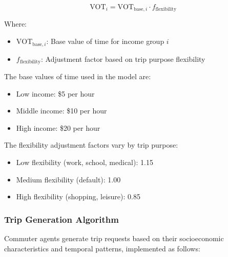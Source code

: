 \begin{equation}
\text{VOT}_i = \text{VOT}_{\text{base},i} \cdot f_{\text{flexibility}}
\end{equation}

Where:
\begin{itemize}
    \item $\text{VOT}_{\text{base},i}$: Base value of time for income group $i$
    \item $f_{\text{flexibility}}$: Adjustment factor based on trip purpose flexibility
\end{itemize}

The base values of time used in the model are:
\begin{itemize}
    \item Low income: \$5 per hour 
    \item Middle income: \$10 per hour 
    \item High income: \$20 per hour 
\end{itemize}

The flexibility adjustment factors vary by trip purpose:
\begin{itemize}
    \item Low flexibility (work, school, medical): 1.15
    \item Medium flexibility (default): 1.00
    \item High flexibility (shopping, leisure): 0.85
\end{itemize}

\subsubsection{Trip Generation Algorithm}
Commuter agents generate trip requests based on their socioeconomic characteristics and temporal patterns, implemented as follows:


